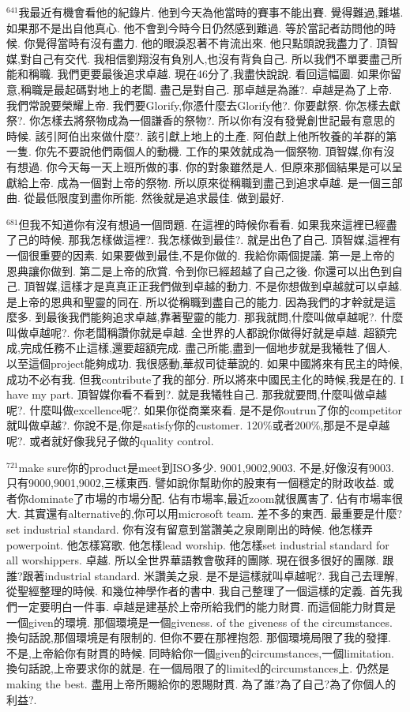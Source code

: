 \documentclass{book}
\begin{document}
$^{641}$我最近有機會看他的紀錄片.
他到今天為他當時的賽事不能出賽.
覺得難過,難堪.
如果那不是出自他真心.
他不會到今時今日仍然感到難過.
等於當記者訪問他的時候.
你覺得當時有沒有盡力.
他的眼淚忍著不肯流出來.
他只點頭說我盡力了.
頂智媒,對自己有交代.
我相信劉翔沒有負別人,也沒有背負自己.
所以我們不單要盡己所能和稱職.
我們更要最後追求卓越.
現在46分了,我盡快說說.
看回這幅圖.
如果你留意,稱職是最起碼對地上的老闆.
盡己是對自己.
那卓越是為誰?.
卓越是為了上帝.
我們常說要榮耀上帝.
我們要Glorify,你憑什麼去Glorify他?.
你要獻祭.
你怎樣去獻祭?.
你怎樣去將祭物成為一個謙香的祭物?.
所以你有沒有發覺創世記最有意思的時候.
該引阿伯出來做什麼?.
該引獻上地上的土產.
阿伯獻上他所牧養的羊群的第一隻.
你先不要說他們兩個人的動機.
工作的果效就成為一個祭物.
頂智媒,你有沒有想過.
你今天每一天上班所做的事.
你的對象雖然是人.
但原來那個結果是可以呈獻給上帝.
成為一個對上帝的祭物.
所以原來從稱職到盡己到追求卓越.
是一個三部曲.
從最低限度到盡你所能.
然後就是追求最佳.
做到最好.

$^{681}$但我不知道你有沒有想過一個問題.
在這裡的時候你看看.
如果我來這裡已經盡了己的時候.
那我怎樣做這裡?.
我怎樣做到最佳?.
就是出色了自己.
頂智媒,這裡有一個很重要的因素.
如果要做到最佳,不是你做的.
我給你兩個提議.
第一是上帝的恩典讓你做到.
第二是上帝的欣賞.
令到你已經超越了自己之後.
你還可以出色到自己.
頂智媒,這樣才是真真正正我們做到卓越的動力.
不是你想做到卓越就可以卓越.
是上帝的恩典和聖靈的同在.
所以從稱職到盡自己的能力.
因為我們的才幹就是這麼多.
到最後我們能夠追求卓越,靠著聖靈的能力.
那我就問,什麼叫做卓越呢?.
什麼叫做卓越呢?.
你老闆稱讚你就是卓越.
全世界的人都說你做得好就是卓越.
超額完成,完成任務不止這樣,還要超額完成.
盡己所能,盡到一個地步就是我犧牲了個人.
以至這個project能夠成功.
我很感動,華叔司徒華說的.
如果中國將來有民主的時候,成功不必有我.
但我contribute了我的部分.
所以將來中國民主化的時候,我是在的.
I have my part.
頂智媒你看不看到?.
就是我犧牲自己.
那我就要問,什麼叫做卓越呢?.
什麼叫做excellence呢?.
如果你從商業來看.
是不是你outrun了你的competitor就叫做卓越?.
你說不是,你是satisfy你的customer.
120\%或者200\%,那是不是卓越呢?.
或者就好像我兒子做的quality control.

$^{721}$make sure你的product是meet到ISO多少.
9001,9002,9003.
不是,好像沒有9003.
只有9000,9001,9002,三樣東西.
譬如說你幫助你的股東有一個穩定的財政收益.
或者你dominate了市場的市場分配.
佔有市場率,最近zoom就很厲害了.
佔有市場率很大.
其實還有alternative的,你可以用microsoft team.
差不多的東西.
最重要是什麼?set industrial standard.
你有沒有留意到當讚美之泉剛剛出的時候.
他怎樣弄powerpoint.
他怎樣寫歌.
他怎樣lead worship.
他怎樣set industrial standard for all worshippers.
卓越.
所以全世界華語教會敬拜的團隊.
現在很多很好的團隊.
跟誰?跟著industrial standard.
米讚美之泉.
是不是這樣就叫卓越呢?.
我自己去理解,從聖經整理的時候.
和幾位神學作者的書中.
我自己整理了一個這樣的定義.
首先我們一定要明白一件事.
卓越是建基於上帝所給我們的能力財貫.
而這個能力財貫是一個given的環境.
那個環境是一個giveness.
of the giveness of the circumstances.
換句話說,那個環境是有限制的.
但你不要在那裡抱怨.
那個環境局限了我的發揮.
不是,上帝給你有財貫的時候.
同時給你一個given的circumstances,一個limitation.
換句話說,上帝要求你的就是.
在一個局限了的limited的circumstances上.
仍然是making the best.
盡用上帝所賜給你的恩賜財貫.
為了誰?為了自己?為了你個人的利益?.
\end{document}
